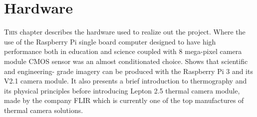 \chapter{Hardware}
\label{chap:hardware}
\lettrine[lines=3]{T}{his} chapter describes the hardware used to realize out
the project. Where the use of the Raspberry Pi single board computer designed
to have high performance both in education and science coupled with 8
mega-pixel camera module CMOS sensor was an almost conditionated  choice. Shows
that scientific and engineering- grade imagery can be produced with the
Raspberry Pi 3 and its V2.1 camera module. It also presents a brief
introduction to thermography and its physical principles before introducing
Lepton 2.5 thermal camera module, made by the company FLIR which is currently
one of the top manufactures of thermal camera solutions.
%



